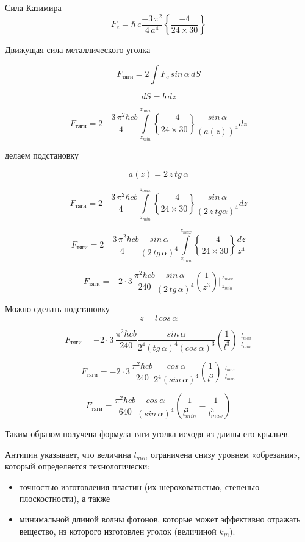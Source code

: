\documentclass[11pt]{article}
\begin{document}
Сила Казимира
\[F_{c} = \hbar\,c\frac{-3\,\pi^2}{4\,a^4}\left\{\frac{-4}{24\times30}\right\}\]

Движущая сила металлического уголка

\[F_{тяги} = 2 \int F_{c} \, sin\, \alpha \,dS\]

\[dS = b\,dz\]

\[F_{тяги} = 2\, \frac{-3\,\pi^2\hbar c b}{4}\int\limits_{z_{min}}^{z_{max}} \left\{\frac{-4}{24\times30}\right\}\frac{sin\, \alpha}{\left(a\left(z\right)\right)^4}dz\]

делаем подстановку

\[a\left(z\right) = 2\,z\,tg\, \alpha\]

\[F_{тяги} = 2\, \frac{-3\,\pi^2\hbar c b}{4}\int\limits_{z_{min}}^{z_{max}} \left\{\frac{-4}{24\times30}\right\}\frac{sin\, \alpha}{\left(2\,z\,tg \alpha\right)^4}dz\]

\[F_{тяги} = 2\, \frac{-3\,\pi^2\hbar c b}{4} \frac{sin\, \alpha}{\left(2\,tg\, \alpha\right)^4} \int\limits_{z_{min}}^{z_{max}} \left\{\frac{-4}{24\times30}\right\} \frac{dz}{z^4}\]

\[F_{тяги} = -2\cdot3\, \frac{\pi^2\hbar c b}{240} \frac{sin\, \alpha}{\left(2\,tg\, \alpha\right)^4} \left(\frac{1}{z^3}\right)\Bigg\rvert_{\,z_{min}}^{\,z_{max}} \]

    Можно сделать подстановку \[z = l\, cos\, \alpha\]

\[F_{тяги} = -2\cdot3\, \frac{\pi^2\hbar c b}{240} \frac{sin\, \alpha}{2^4\left(tg\,\alpha\right)^4\left(cos\, \alpha\right)^3} \left(\frac{1}{l^3}\right)\Bigg\rvert_{\,l_{min}}^{\,l_{max}} \]

\[F_{тяги} = -2\cdot3\, \frac{\pi^2\hbar c b}{240} \frac{cos\, \alpha}{2^4\left(sin\, \alpha\right)^4} \left(\frac{1}{l^3}\right)\Bigg\rvert_{\,l_{min}}^{\,l_{max}} \]

\[F_{тяги} = \frac{\pi^2\hbar c b}{640} \frac{cos\, \alpha}{\left(sin\, \alpha\right)^4} \left(\frac{1}{l_{min}^3} - \frac{1}{l_{max}^3}\right)\]

Таким образом получена формула тяги уголка исходя из длины его крыльев.

Антипин указывает, что величина \(l_{min}\) ограничена снизу уровнем
«обрезания», который определяется технологически:

\begin{itemize}
\item
  точностью изготовления пластин (их шероховатостью, степенью
  плоскостности), а также
\item
  минимальной длиной волны фотонов, которые может эффективно отражать
  вещество, из которого изготовлен уголок (величиной \(k_m\)).
\end{itemize}
\end{document}

